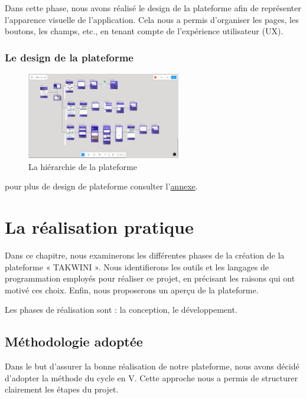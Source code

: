 \documentclass{article}
\begin{document}
\hspace{0,3cm}

\noindent Dans cette phase, nous avons réalisé le design de la plateforme afin de représenter l’apparence visuelle de l’application. Cela nous a permis d’organiser les pages, les boutons, les champs, etc., en tenant compte de l’expérience utilisateur (UX).
\subsubsection{Le design de la plateforme}
\begin{figure}[H]
  \centering
  \includegraphics[width=0.6\textwidth]{archifigma.PNG}
  \caption{La hiérarchie de la plateforme}
  \end{figure}

  pour plus de design de plateforme consulter l'\hyperref[annexe-design]{annexe}.


  \newpage
\section{La réalisation pratique}


\hspace*{2em}Dans ce chapitre, nous examinerons les différentes phases de la création de la plateforme « TAKWINI ». Nous identifierons les outils et les langages de programmation employés pour réaliser ce projet, en précisant les raisons qui ont motivé ces choix. Enfin, nous proposerons un aperçu de la plateforme.

\noindent Les phases de réalisation sont : la conception, le développement.
\subsection{Méthodologie adoptée}

\hspace*{2em}Dans le but d'assurer la bonne réalisation de notre plateforme, nous avons décidé d'adopter la méthode du cycle en V. Cette approche nous a permis de structurer clairement les étapes du projet.
\end{document}

